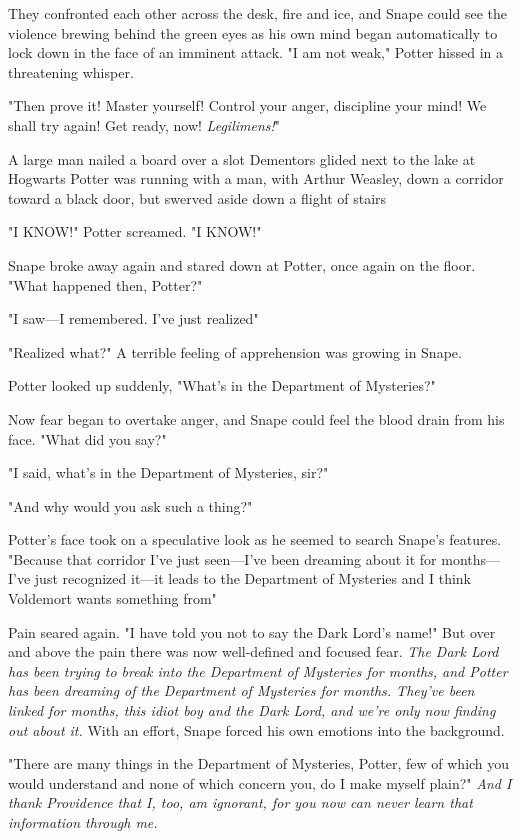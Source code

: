 They confronted each other across the desk, fire and ice, and Snape could see the violence brewing behind the green eyes as his own mind began automatically to lock down in the face of an imminent attack. "I am not weak," Potter hissed in a threatening whisper.

"Then prove it! Master yourself! Control your anger, discipline your mind! We shall try again! Get ready, now! \emph{Legilimens!}"

A large man nailed a board over a slot{\el} Dementors glided next to the lake at Hogwarts{\el} Potter was running with a man, with Arthur Weasley, down a corridor toward a black door, but swerved aside down a flight of stairs{\el}

"I KNOW!" Potter screamed. "I KNOW!"

Snape broke away again and stared down at Potter, once again on the floor. "What happened then, Potter?"

"I saw—I remembered. I've just realized{\el}"

"Realized what?" A terrible feeling of apprehension was growing in Snape.

Potter looked up suddenly, "What's in the Department of Mysteries?"

Now fear began to overtake anger, and Snape could feel the blood drain from his face. "What did you say?"

"I said, what's in the Department of Mysteries, sir?"

"And why{\el} would you ask such a thing?"

Potter's face took on a speculative look as he seemed to search Snape's features. "Because that corridor I've just seen—I've been dreaming about it for months—I've just recognized it—it leads to the Department of Mysteries{\el} and I think Voldemort wants something from{\el}"

Pain seared again. "I have told you not to say the Dark Lord's name!" But over and above the pain there was now well-defined and focused fear. \emph{The Dark Lord has been trying to break into the Department of Mysteries for months, and Potter has been dreaming of the Department of Mysteries for months. They've been linked for months, this idiot boy and the Dark Lord, and we're only now finding out about it.} With an effort, Snape forced his own emotions into the background.

"There are many things in the Department of Mysteries, Potter, few of which you would understand and none of which concern you, do I make myself plain?" \emph{And I thank Providence that I, too, am ignorant, for you now can never learn that information through me.}


